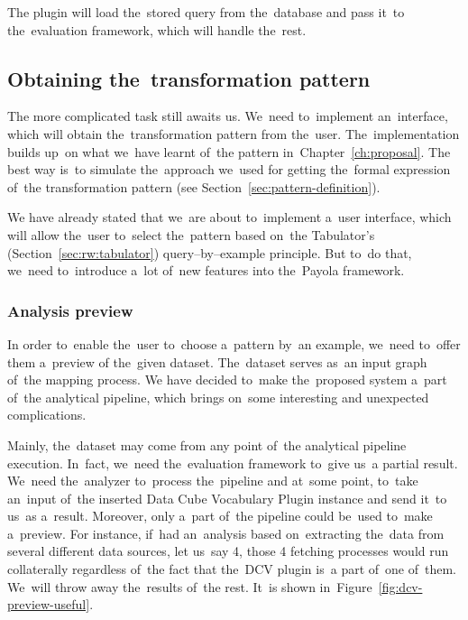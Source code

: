 The plugin will load the~stored query from the~database and pass it~to the~evaluation framework, which will handle the~rest.

\subsection{Obtaining the~transformation pattern}
The more complicated task still awaits us. We~need to~implement an~interface, 
which will obtain the~transformation pattern from the~user. The~implementation 
builds up~on what we~have learnt of~the pattern in~Chapter~\ref{ch:proposal}.
The best way is~to simulate the~approach we~used for getting the~formal expression of~the transformation pattern
(see Section~\ref{sec:pattern-definition}).

We have already stated that we~are about to~implement a~user interface, which 
will allow the~user to~select the~pattern based on~the Tabulator's (Section~\ref{sec:rw:tabulator})
query--by--example principle. But to~do that, we~need to~introduce a~lot of~new 
features into the~Payola framework.

\subsubsection{Analysis preview}
In order to~enable the~user to~choose a~pattern by~an example, we~need to~offer them a~preview
of the~given dataset. The~dataset serves as~an input graph of~the mapping process. 
We have decided to~make the~proposed system a~part of~the analytical 
pipeline, which brings on~some interesting and unexpected complications.

Mainly, the~dataset may come from any point of~the analytical pipeline execution. In~fact, we~need the~evaluation framework to~give us~a partial result. We~need the~analyzer to~process the~pipeline and at~some point, to~take an~input of~the 
inserted Data Cube Vocabulary Plugin instance and send it~to us~as a~result. 
Moreover, only a~part of~the pipeline could be~used to~make a~preview. For instance, if~had an~analysis
based on~extracting the~data from several different data sources, 
let us~say 4, those 4 fetching processes would run collaterally regardless of~the 
fact that the~DCV plugin is~a part of~one of~them. We~will throw away the~results of~the rest. It~is shown in~Figure~\ref{fig:dcv-preview-useful}.

